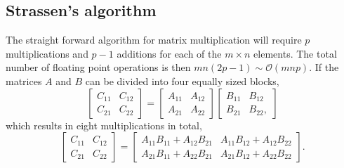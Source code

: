 \subsection{Strassen's algorithm}
The straight forward algorithm for matrix multiplication will require $p$ multiplications and $p-1$ additions for each of the $m\times n$ elements. The total number of floating point operations is then $mn(2p-1) \sim \mathcal{O}(mnp)$. If the matrices $A$ and $B$ can be divided into four equally sized blocks,
\begin{equation}
\begin{bmatrix}
C_{11} & C_{12} \\
C_{21} & C_{22}
\end{bmatrix}
=
\begin{bmatrix}
A_{11} & A_{12} \\
A_{21} & A_{22} 
\end{bmatrix}
\begin{bmatrix}
B_{11} & B_{12} \\
B_{21} & B_{22},
\end{bmatrix}
\end{equation}
which results in eight multiplications in total,
\begin{equation}
\begin{bmatrix}
C_{11} & C_{12} \\
C_{21} & C_{22}
\end{bmatrix}
=
\begin{bmatrix}
A_{11} B_{11} + A_{12} B_{21} & A_{11} B_{12} + A_{12} B_{22} \\
A_{21} B_{11} + A_{22} B_{21} & A_{21} B_{12} + A_{22} B_{22} 
\end{bmatrix}
.
\end{equation}



